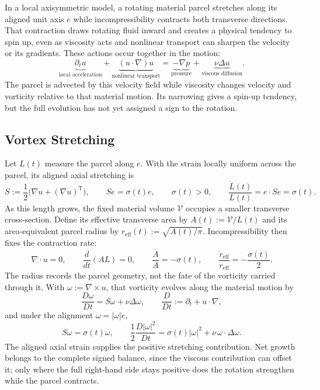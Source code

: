 
In a local axisymmetric model, a rotating material parcel stretches along its aligned unit axis \(e\) while incompressibility contracts both transverse directions. That contraction draws rotating fluid inward and creates a physical tendency to spin up, even as viscosity acts and nonlinear transport can sharpen the velocity or its gradients. These actions occur together in the motion:
\[
  \underbrace{\partial_t u}_{\text{local acceleration}}
  +
  \underbrace{(u\cdot\nabla)u}_{\text{nonlinear transport}}
  =
  \underbrace{-\nabla p}_{\text{pressure}}
  +
  \underbrace{\nu\Delta u}_{\text{viscous diffusion}}.
\]
The parcel is advected by this velocity field while viscosity changes velocity and vorticity relative to that material motion. Its narrowing gives a spin-up tendency, but the full evolution has not yet assigned a sign to the rotation.

\subsection{Vortex Stretching}\label{sub:ThePerfectlyStretchingVortex}

Let \(L(t)\) measure the parcel along \(e\). With the strain locally uniform across the parcel, its aligned axial stretching is
\[
  S:=\frac12\bigl(\nabla u+(\nabla u)^{\mathsf T}\bigr),
  \qquad
  Se=\sigma(t)e,
  \qquad
  \sigma(t)>0,
  \qquad
  \frac{\dot L(t)}{L(t)}
  =
  e\cdot Se
  =
  \sigma(t).
\]
As this length grows, the fixed material volume \(\mathcal V\) occupies a smaller transverse cross-section. Define its effective transverse area by \(A(t):=\mathcal V/L(t)\) and its area-equivalent parcel radius by \(r_{\mathrm{eff}}(t):=\sqrt{A(t)/\pi}\). Incompressibility then fixes the contraction rate:
\[
  \nabla\cdot u=0,
  \qquad
  \frac{d}{dt}(A L)=0,
  \qquad
  \frac{\dot A}{A}=-\sigma(t),
  \qquad
  \frac{\dot r_{\mathrm{eff}}}{r_{\mathrm{eff}}}
  =
  -\frac{\sigma(t)}{2}.
\]
The radius records the parcel geometry, not the fate of the vorticity carried through it. With \(\omega:=\nabla\times u\), that vorticity evolves along the material motion by
\[
  \frac{D\omega}{Dt}
  =
  S\omega+\nu\Delta\omega,
  \qquad
  \frac{D}{Dt}
  :=
  \partial_t+u\cdot\nabla,
\]
and under the alignment \(\omega=|\omega|e\),
\[
  S\omega
  =
  \sigma(t)\omega,
  \qquad
  \frac12\frac{D|\omega|^2}{Dt}
  =
  \sigma(t)|\omega|^2
  +
  \nu\,\omega\cdot\Delta\omega.
\]
The aligned axial strain supplies the positive stretching contribution. Net growth belongs to the complete signed balance, since the viscous contribution can offset it; only where the full right-hand side stays positive does the rotation strengthen while the parcel contracts.

